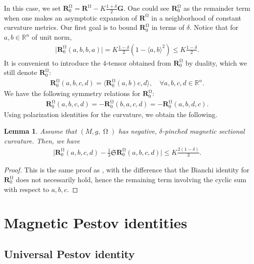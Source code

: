 \documentclass[12pt]{amsart}
\numberwithin{numbering}{section}
\theoremstyle{plain}
\newtheorem{lem}[numbering]{Lemma}
\theoremstyle{definition}
\theoremstyle{remark}
\numberwithin{equation}{section}
\DeclareMathOperator{\mg}{\Omega}
\newcommand{\rsfm}{\mathbf{R}^{\mg}}
\newcommand{\R}{\mathbb{R}}
\newcommand{\frk}[1]{\mathfrak{#1}}
\begin{document}
In this case, we set $\rsfm_0 = \rsfm - K \frac{1+\delta}{2} \mathbf{G}$. One could see $\rsfm_0$ as the remainder term when one makes an asymptotic expansion of $\mathbf{R}^{\mg}$ in a neighborhood of constant curvature metrics. Our first goal is to bound $\rsfm_0$ in terms of $\delta$. Notice that for $a, b \in \R^n$ of unit norm, 
\begin{align*}
\vert \rsfm_0(a, b, b, a) \vert = K \frac{1-\delta}{2} (1 - \langle a, b \rangle^2) \leq K \frac{1-\delta}{2}.
\end{align*}
It is convenient to introduce the $4$-tensor obtained from $\rsfm_0$ by duality, which we still denote $\rsfm_0$:
\begin{align*}
\rsfm_0(a, b, c, d) = \langle \rsfm_0(a, b) c, d \rangle, \quad \forall a, b, c, d \in \R^n.
\end{align*}
We have the following symmetry relations for $\rsfm_0$:
\begin{align*}
\rsfm_0(a, b, c, d) = - \rsfm_0(b, a, c, d) = - \rsfm_0(a, b, d, c).
\end{align*}
Using polarization identities for the curvature, we obtain the following.

\begin{lem} \label{lem:decomp_curv}
Assume that $(M, g, \mg)$ has negative, $\delta$-pinched magnetic sectional curvature. Then, we have 
\begin{align}
\vert \rsfm_0(a, b, c, d) - \frac{1}{3} \frk{S} \rsfm_0(a, b, c, d) \vert \leq K \frac{2(1-\delta)}{3}.
\end{align}
\end{lem}
\begin{proof}
This is the same proof as \cite[Lemma 19.2.3]{lefeuvre2024microlocal}, with the difference that the Bianchi identity for $\rsfm_0$ does not necessarily hold, hence the remaining term involving the cyclic sum with respect to $a, b, c$.
\end{proof}


\section{Magnetic Pestov identities} \label{sec:mag_pestov}

\subsection{Universal Pestov identity} \label{sec:mag_pestov_fm}
\end{document}
